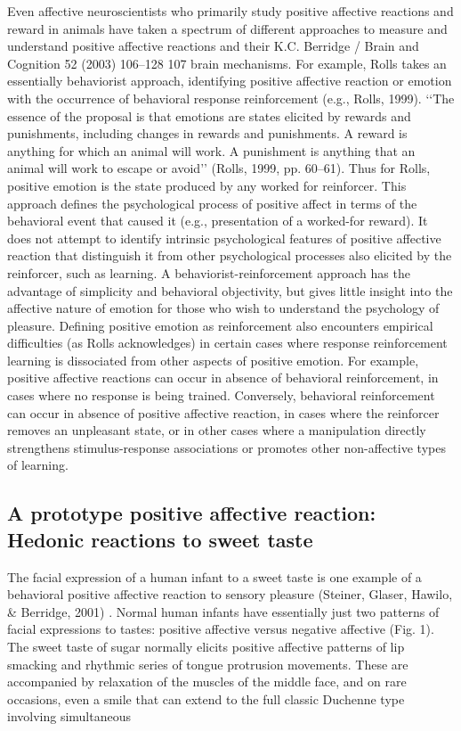 \documentclass[conference]{IEEEtran}
\begin{document}
Even affective neuroscientists who primarily study
positive affective reactions and reward in animals have
taken a spectrum of different approaches to measure
and understand positive affective reactions and their
K.C. Berridge / Brain and Cognition 52 (2003) 106–128 107
brain mechanisms. For example, Rolls takes an essentially behaviorist approach, identifying positive affective reaction or emotion with the occurrence of
behavioral response reinforcement (e.g., Rolls, 1999).
‘‘The essence of the proposal is that emotions are states
elicited by rewards and punishments, including changes
in rewards and punishments. A reward is anything for
which an animal will work. A punishment is anything
that an animal will work to escape or avoid’’ (Rolls,
1999, pp. 60–61). Thus for Rolls, positive emotion is
the state produced by any worked for reinforcer. This
approach defines the psychological process of positive
affect in terms of the behavioral event that caused it
(e.g., presentation of a worked-for reward). It does not
attempt to identify intrinsic psychological features of
positive affective reaction that distinguish it from other
psychological processes also elicited by the reinforcer,
such as learning. A behaviorist-reinforcement approach
has the advantage of simplicity and behavioral objectivity, but gives little insight into the affective nature of
emotion for those who wish to understand the psychology of pleasure. Defining positive emotion as reinforcement also encounters empirical difficulties (as
Rolls acknowledges) in certain cases where response
reinforcement learning is dissociated from other aspects
of positive emotion. For example, positive affective
reactions can occur in absence of behavioral reinforcement, in cases where no response is being trained.
Conversely, behavioral reinforcement can occur in absence of positive affective reaction, in cases where the
reinforcer removes an unpleasant state, or in other
cases where a manipulation directly strengthens stimulus-response associations or promotes other non-affective types of learning.



\subsection{ A prototype positive affective reaction: Hedonic reactions to sweet taste}


The facial expression of a human infant to a sweet
taste is one example of a behavioral positive affective
reaction to sensory pleasure (Steiner, Glaser, Hawilo, \& Berridge, 2001)
. Normal human infants have essentially just two patterns of facial expressions to tastes: positive affective versus negative affective
(Fig. 1). The sweet taste of sugar normally elicits positive affective patterns of lip smacking and rhythmic series of tongue protrusion movements. These are
accompanied by relaxation of the muscles of the middle
face, and on rare occasions, even a smile that can extend
to the full classic Duchenne type involving simultaneous
\end{document}
